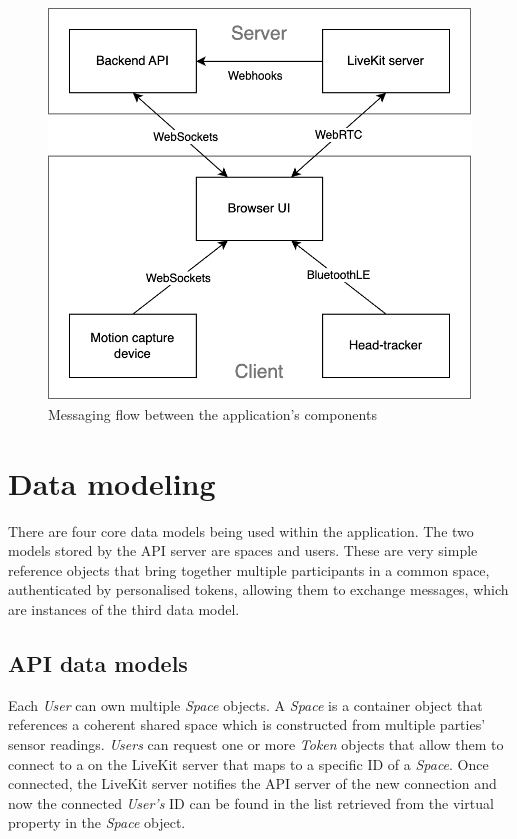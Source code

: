 \begin{figure}[h]
\centering
\includegraphics[scale=0.4]{04_Artefakte/01_Abbildungen/application-messaging-flow}
\caption[Application messaging flow]{Messaging flow between the application's components\protect}
\label{fig:messagingFlow}
\end{figure}

\section{Data modeling}
\label{section:dataModeling}

There are four core data models being used within the application. The two models stored by the \ac{API} server are spaces and users. These are very simple reference objects that bring together multiple participants in a common space, authenticated by personalised tokens, allowing them to exchange messages, which are instances of the third data model.

\subsection{API data models}

Each \emph{User} can own multiple \emph{Space} objects. A \emph{Space} is a container object that references a coherent shared space which is constructed from multiple parties' sensor readings. \emph{Users} can request one or more \emph{Token} objects that allow them to connect to a  on the LiveKit server that maps to a specific ID of a \emph{Space}. Once connected, the LiveKit server notifies the \ac{API} server of the new connection and now the connected \emph{User's} ID can be found in the list retrieved from the virtual  property in the \emph{Space} object.

